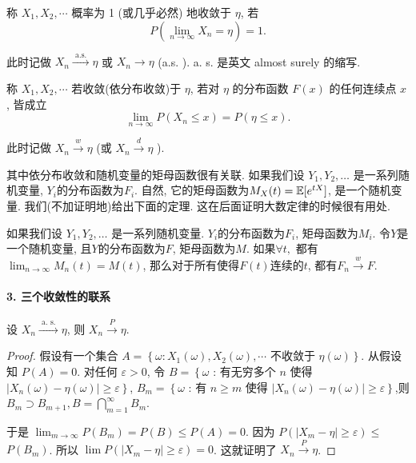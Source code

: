 \begin{definition}
    称 $X_1, X_2, \cdots$ 概率为 1 (或几乎必然) 地收敛于 $\eta$, 若
$$
P\left(\lim _{n \rightarrow \infty} X_n=\eta\right)=1 .
$$

此时记做 $X_n \stackrel{\text { a.s. }}{\longrightarrow} \eta$ 或 $X_n \rightarrow \eta$ (a.s. ). a. s. 是英文 almost surely 的缩写.
\end{definition}

\begin{definition}
    称 $X_1, X_2, \cdots$ 若收敛(依分布收敛)于 $\eta$, 若对 $\eta$ 的分布函数 $F(x)$ 的任何连续点 $x$, 皆成立
    $$
    \lim _{n \rightarrow \infty} P\left(X_n \leq x\right)=P(\eta \leq x) .
    $$
    
    此时记做 $X_n \stackrel{w}{\longrightarrow} \eta$ (或 $X_n \stackrel{d}{\longrightarrow} \eta$ ).
\end{definition}

其中依分布收敛和随机变量的矩母函数很有关联. 如果我们设 $Y_1, Y_2, \dots$ 是一系列随机变量, $Y_i$的分布函数为$F_i$. 自然, 它的矩母函数为$M_X(t)=\mathbb E[ e^{t X}]$, 是一个随机变量. 我们(不加证明地)给出下面的定理. 这在后面证明大数定律的时候很有用处. 

\begin{theorem}
    \label{thm:dist-moment}
    如果我们设 $Y_1, Y_2, \dots$ 是一系列随机变量. $Y_i$的分布函数为$F_i$, 矩母函数为$M_i$. 令$Y$是一个随机变量, 且$Y$的分布函数为$F$, 矩母函数为$M$. 如果$\forall t,$ 都有$\lim _{n \rightarrow \infty} M_n(t)=M(t)$, 那么对于所有使得$F(t)$连续的$t$, 都有$F_n \stackrel{w}{\longrightarrow} F$. 
\end{theorem}

\paragraph{3. 三个收敛性的联系}

\begin{theorem}
    设 $X_n \stackrel{\text { a. s. }}{\longrightarrow} \eta$, 则 $X_n \stackrel{P}{\longrightarrow} \eta$.
\end{theorem}

\begin{proof}
    假设有一个集合 $A=\left\{\omega: X_1(\omega), X_2(\omega), \cdots\right.$ 不收敛于 $\left.\eta(\omega)\right\}$. 从假设知 $P(A)=0$. 对任何 $\varepsilon>0$, 令
$B=\left\{\omega\right.$ : 有无穷多个 $n$ 使得 $\left.\left|X_n(\omega)-\eta(\omega)\right| \geqslant \varepsilon\right\}$,
$B_m=\left\{\omega\right.$ : 有 $n \geqslant m$ 使得 $\left.\left|X_n(\omega)-\eta(\omega)\right| \geqslant \varepsilon\right\}$,则 $B_m \supset B_{m+1}, B=\bigcap_{m=1}^{\infty} B_m$.

于是 $\lim _{m \rightarrow \infty} P\left(B_m\right)=P(B) \leq P(A)=0$. 因为 $P\left(\left|X_m-\eta\right| \geqslant \varepsilon\right) \leq$ $P\left(B_m\right)$. 所以 $\lim P\left(\left|X_m-\eta\right| \geqslant \varepsilon\right)=0$. 这就证明了 $X_n \stackrel{P}{\longrightarrow} \eta$.
\end{proof}

